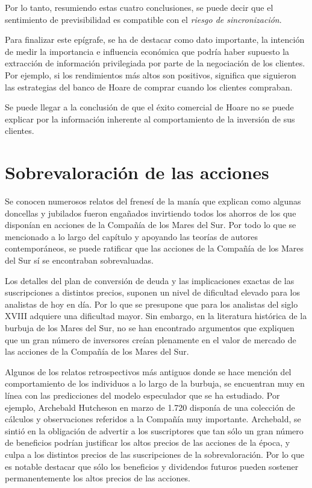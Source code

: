 Por lo tanto, resumiendo estas cuatro conclusiones, se puede decir que el sentimiento de previsibilidad es compatible con el \emph{riesgo de sincronización}.

Para finalizar este epígrafe, se ha de destacar como dato importante, la intención de medir la importancia e influencia económica que podría haber supuesto la extracción de información privilegiada por parte de la negociación de los clientes. Por ejemplo, si los rendimientos más altos son positivos, significa que siguieron las estrategias del banco de Hoare de comprar cuando los clientes compraban.

Se puede llegar a la conclusión de que el éxito comercial de Hoare no se puede explicar por la información inherente al comportamiento de la inversión de sus clientes.

\section{Sobrevaloración de las acciones}

Se conocen numerosos relatos del frenesí de la manía que explican como algunas doncellas y jubilados fueron engañados invirtiendo todos los ahorros de los que disponían en acciones de la Compañía de los Mares del Sur. Por todo lo que se mencionado a lo largo del capítulo y apoyando las teorías de autores contemporáneos, se puede ratificar que las acciones de la Compañía de los Mares del Sur sí se encontraban sobrevaluadas.

Los detalles del plan de conversión de deuda y las implicaciones exactas de las suscripciones a distintos precios, suponen un nivel de dificultad elevado para los analistas de hoy en día. Por lo que se presupone que para los analistas del siglo XVIII adquiere una dificultad mayor. Sin embargo, en la literatura histórica de la burbuja de los Mares del Sur, no se han encontrado argumentos que expliquen que un gran número de inversores creían plenamente en el valor de mercado de las acciones de la Compañía de los Mares del Sur.

Algunos de los relatos retrospectivos más antiguos donde se hace mención del comportamiento de los individuos a lo largo de la burbuja, se encuentran muy en línea con las predicciones del modelo especulador que se ha estudiado. Por ejemplo, Archebald Hutcheson en marzo de 1.720 disponía de una colección de cálculos y observaciones referidos a la Compañía muy importante. Archebald, se sintió en la obligación de advertir a los suscriptores que tan sólo un gran número de beneficios podrían justificar los altos precios de las acciones de la época, y culpa a los distintos precios de las suscripciones de la sobrevaloración. Por lo que es notable destacar que sólo los beneficios y dividendos futuros pueden sostener permanentemente los altos precios de las acciones. 

